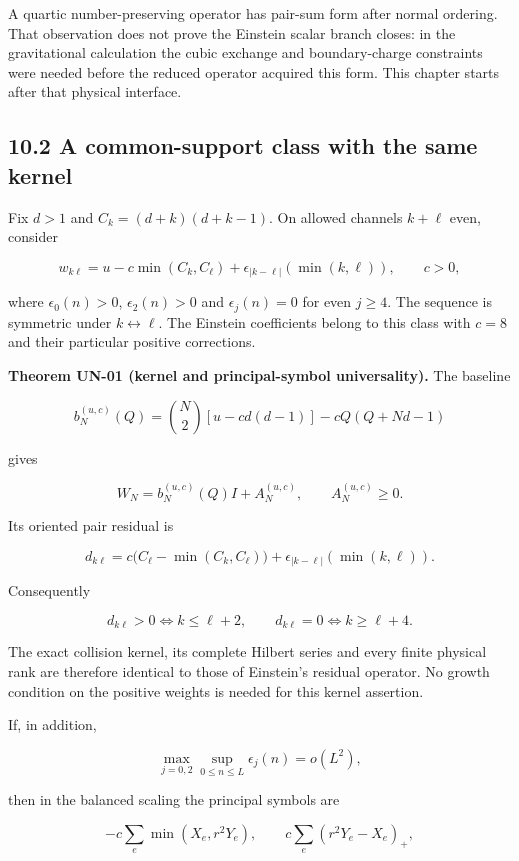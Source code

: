 A quartic number-preserving operator has pair-sum form after normal ordering. That observation does not prove the Einstein scalar branch closes: in the gravitational calculation the cubic exchange and boundary-charge constraints were needed before the reduced operator acquired this form. This chapter starts after that physical interface.

\hypertarget{a-common-support-class-with-the-same-kernel}{%
\subsection{10.2 A common-support class with the same kernel}\label{a-common-support-class-with-the-same-kernel}}

Fix \(d>1\) and \(C_k=(d+k)(d+k-1)\). On allowed channels \(k+\ell\) even, consider

\[
w_{k\ell}=u-c\min(C_k,C_\ell)+\epsilon_{|k-\ell|}(\min(k,\ell)),
\qquad c>0,
\]

where \(\epsilon_0(n)>0\), \(\epsilon_2(n)>0\) and \(\epsilon_j(n)=0\) for even \(j\geq4\). The sequence is symmetric under \(k\leftrightarrow\ell\). The Einstein coefficients belong to this class with \(c=8\) and their particular positive corrections.

\textbf{Theorem UN-01 (kernel and principal-symbol universality).} The baseline

\[
b_N^{(u,c)}(Q)=
\binom N2[u-cd(d-1)]-cQ(Q+Nd-1)
\]

gives

\[
W_N=b_N^{(u,c)}(Q)I+A_N^{(u,c)},\qquad A_N^{(u,c)}\geq0.
\]

Its oriented pair residual is

\[
d_{k\ell}=c\big(C_\ell-\min(C_k,C_\ell)\big)
+\epsilon_{|k-\ell|}(\min(k,\ell)).
\]

Consequently

\[
d_{k\ell}>0\iff k\leq\ell+2,\qquad
d_{k\ell}=0\iff k\geq\ell+4.
\]

The exact collision kernel, its complete Hilbert series and every finite physical rank are therefore identical to those of Einstein's residual operator. No growth condition on the positive weights is needed for this kernel assertion.

If, in addition,

\[
\max_{j=0,2}\sup_{0\leq n\leq L}\epsilon_j(n)=o(L^2),
\]

then in the balanced scaling the principal symbols are

\[
-c\sum_e\min(X_e,r^2Y_e),\qquad
c\sum_e(r^2Y_e-X_e)_+,
\]

